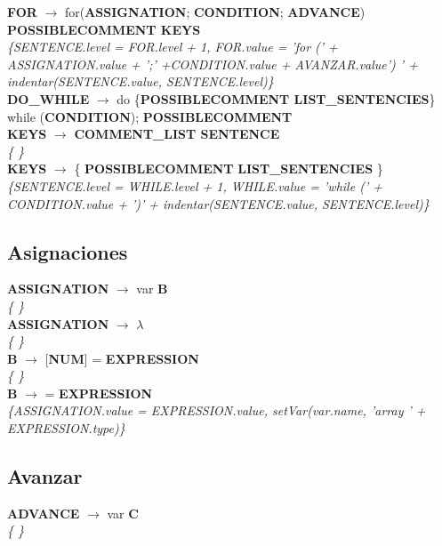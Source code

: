 \documentclass[10pt,a4paper]{article}
\begin{document}
\textbf{FOR} $\rightarrow$ for(\textbf{ASSIGNATION}; \textbf{CONDITION}; \textbf{ADVANCE}) \textbf{POSSIBLECOMMENT KEYS}  \\
\textit{\{SENTENCE.level = FOR.level + 1, FOR.value = 'for (' + ASSIGNATION.value + ';' +CONDITION.value + AVANZAR.value') ' + indentar(SENTENCE.value, SENTENCE.level)\}}\\

\textbf{DO\_WHILE} $\rightarrow$ do \{\textbf{POSSIBLECOMMENT LIST\_SENTENCIES}\} while (\textbf{CONDITION}); \textbf{POSSIBLECOMMENT} \\

\textbf{KEYS} $\rightarrow$ \textbf{COMMENT\_LIST SENTENCE} \\ 
\textit{\{   \}} \\

\textbf{KEYS} $\rightarrow$ \{ \textbf{POSSIBLECOMMENT} \textbf{LIST\_SENTENCIES} \} \\
\textit{\{SENTENCE.level = WHILE.level + 1, WHILE.value = 'while (' + CONDITION.value + ')' + indentar(SENTENCE.value, SENTENCE.level)\}} \\

\subsection{Asignaciones}
\textbf{ASSIGNATION} $\rightarrow$ var \textbf{B} \\
\textit{\{   \}} \\

\textbf{ASSIGNATION} $\rightarrow$ $\lambda$ \\
\textit{\{   \}} \\

\textbf{B} $\rightarrow$ [\textbf{NUM}] = \textbf{EXPRESSION}  \\
\textit{\{   \}} \\

\textbf{B} $\rightarrow$ = \textbf{EXPRESSION} \\
\textit{\{ASSIGNATION.value = EXPRESSION.value, setVar(var.name, 'array ' + EXPRESSION.type)\}} \\

\subsection{Avanzar}
\textbf{ADVANCE} $\rightarrow$ var \textbf{C} \\
\textit{\{   \}} \\
\end{document}
